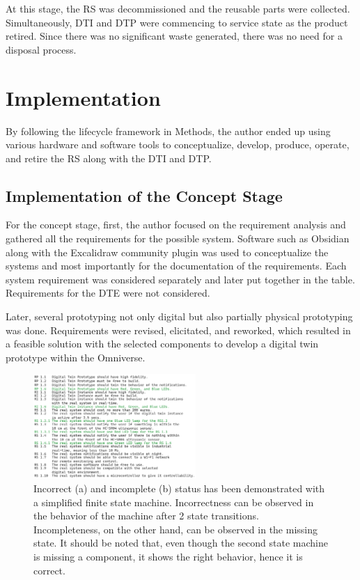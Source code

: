 \documentclass[conference]{IEEEtran}
\begin{document}
    At this stage, the RS was decommissioned and the reusable parts were collected. Simultaneously, DTI and DTP were commencing to service state as the product retired. Since there was no significant waste generated, there was no need for a disposal process.   

    \section{Implementation}\label{section:implementation}

    By following the lifecycle framework in Methods, the author ended up using various hardware and software tools to conceptualize, develop, produce, operate, and retire the RS along with the DTI and DTP.

    \subsection{Implementation of the Concept Stage}
    For the concept stage, first, the author focused on the requirement analysis and gathered all the requirements for the possible system. Software such as Obsidian along with the Excalidraw community plugin was used to conceptualize the systems and most importantly 
    for the documentation of the requirements. Each system requirement was considered separately and later put together in the table. Requirements for the DTE were not considered.    

    Later, several prototyping not only digital but also partially physical prototyping was done. 
    Requirements were revised, elicitated, and reworked, which resulted in a feasible solution with the selected components to develop a digital twin prototype within the Omniverse.
    
    \begin{figure}[htbp]
        \centering
        \includegraphics[width=0.55\textwidth]{Requirements.png}
        \caption{Incorrect (a) and incomplete (b) status has been demonstrated with a simplified finite state machine. Incorrectness can be observed in the behavior 
        of the machine after 2 state transitions. Incompleteness, on the other hand, can be observed in the missing state. It should be noted that, even though the second state machine is missing a 
        component, it shows the right behavior, hence it is correct.}\label{fig:Requirements}
    \end{figure}
\end{document}
